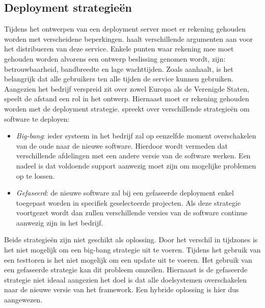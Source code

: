 \subsection{Deployment strategieën}
Tijdens het ontwerpen van een deployment server moet er rekening gehouden worden met verscheidene beperkingen.
\citet{patterson2008data} haalt verschillende argumenten aan voor het distribueren van deze service.
Enkele punten waar rekening mee moet gehouden worden alvorens een ontwerp beslissing genomen wordt, zijn: betrouwbaarheid, bandbreedte en lage wachttijden.
Zoals \citet{patterson2008data} aanhaalt, is het belangrijk dat alle gebruikers ten alle tijden de service kunnen gebruiken.
Aangezien het bedrijf verspreid zit over zowel Europa als de Verenigde Staten, speelt de afstand een rol in het ontwerp.
Hiernaast moet er rekening gehouden worden met de deployment strategie.
\citet{munch2012software} spreekt over verschillende strategieën om software te deployen:
\begin{itemize}
\item \emph{Big-bang}: ieder systeem in het bedrijf zal op eenzelfde moment overschakelen van de oude naar de nieuwe software. Hierdoor wordt vermeden dat verschillende afdelingen met een andere versie van de software werken. Een nadeel is dat voldoende support aanwezig moet zijn om mogelijke problemen op te lossen.
\item \emph{Gefaseerd}: de nieuwe software zal bij een gefaseerde deployment enkel toegepast worden in specifiek geselecteerde projecten. Als deze strategie voortgezet wordt dan zullen verschillende versies van de software continue aanwezig zijn in het bedrijf.
\end{itemize}
Beide strategieën zijn niet geschikt als oplossing.
Door het verschil in tijdzones is het niet mogelijk om een big-bang strategie uit te voeren.
Tijdens het gebruik van een testtoren is het niet mogelijk om een update uit te voeren.
Het gebruik van een gefaseerde strategie kan dit probleem omzeilen.
Hiernaast is de gefaseerde strategie niet ideaal aangezien het doel is dat alle doelsystemen overschakelen naar de nieuwe versie van het framework.
Een hybride oplossing is hier dus aangewezen.

